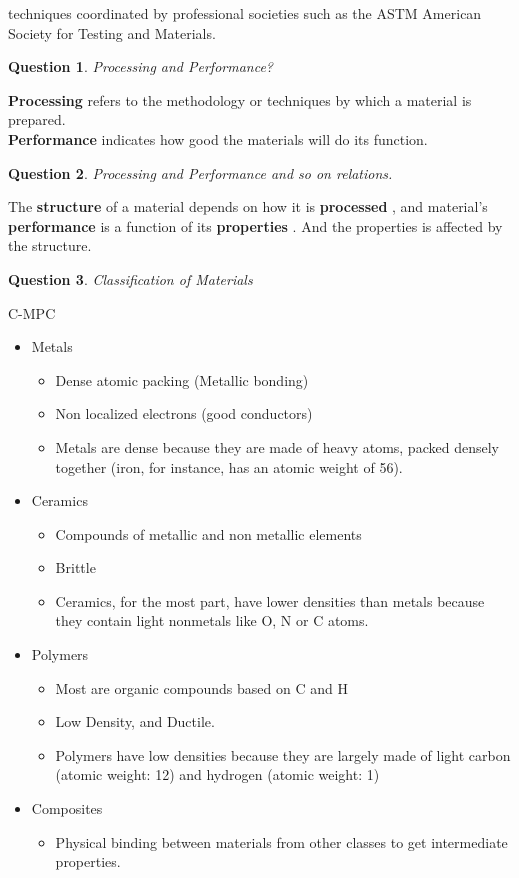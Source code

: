 \documentclass[13]{article}
\newtheorem{exer}{Question}
\begin{document}
techniques coordinated by professional societies such as the ASTM American Society for Testing and Materials. 
\begin{exer}
Processing and Performance?
\end{exer}
\textbf{Processing} refers to the methodology or techniques by which a material is prepared. \\
\textbf{Performance} indicates how good the materials will do its function.
\begin{exer}
Processing and Performance and so on relations.
\end{exer}
The \textbf{structure}  of a material depends on how it is \textbf{processed} , and material's \textbf{performance} is a function of its \textbf{properties} . And the properties is affected by the structure. 
\begin{exer}
Classification of Materials
\end{exer}
C-MPC
\begin{itemize}

\item Metals
\begin{itemize}

	\item Dense atomic packing (Metallic bonding)
	\item Non localized electrons (good conductors)
	\item Metals are dense because they are made of heavy atoms, packed 
densely together (iron, for instance, has an atomic weight of 56).
\end{itemize}
\item Ceramics
\begin{itemize}

\item Compounds of metallic and non metallic elements
\item Brittle
\item Ceramics, for the most part, have lower densities than metals because
	they contain light nonmetals like O, N or C atoms.
\end{itemize}
\item Polymers
	\begin{itemize}
	
	\item Most are organic compounds based on C and H
	\item Low Density, and Ductile.
	\item Polymers have low densities because they are largely made of
		light carbon (atomic weight: 12) and hydrogen (atomic weight:
		1) 	
	\end{itemize}
\item Composites
\begin{itemize}

\item Physical binding between materials from other classes to get intermediate properties.

\end{itemize}
\end{itemize}
\end{document}
